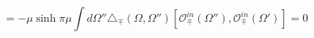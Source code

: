 \begin{equation}
[\mathcal{O}^{out}_{\pm}(\Omega),\mathcal{O}^{in}
_{\mp}(\Omega')]=
-\mu\sinh\pi\mu\int d\Omega''
\triangle_{\mp}(\Omega,\Omega'')
[\mathcal{O}^{in}_{\mp}(\Omega''),
\mathcal{O}^{in}_{\mp}(\Omega')]=0
\end{equation}

